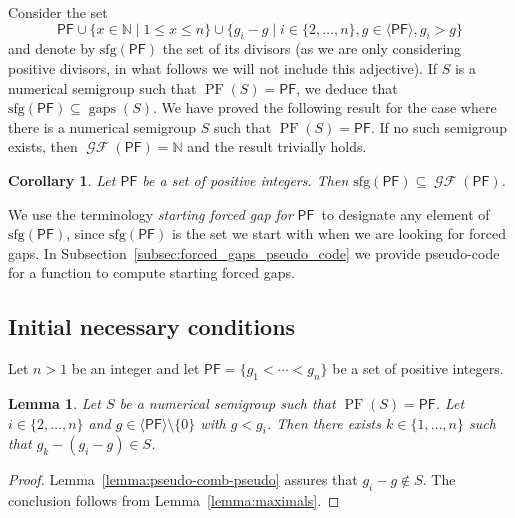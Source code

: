 \documentclass[11pt]{amsart}
\newtheorem{lemma}[theorem]{Lemma}
\newtheorem{corollary}[theorem]{Corollary}
\theoremstyle{remark}
\begin{document}
Consider the set
$${\ensuremath{\mathsf{PF}}}\cup\{x\in\mathbb{N}\mid 1\le x\le n\}\cup\{g_i-g\mid i\in \{2,\ldots,n\}, g\in\langle {\ensuremath{\mathsf{PF}}}\rangle, g_i>g\}$$
and denote by $\mathrm{sfg}({\ensuremath{\mathsf{PF}}})$ the set of its divisors (as we are only considering positive divisors, in what follows we will not include this adjective).
If $S$ is a numerical semigroup such that $\operatorname{PF}(S)={\ensuremath{\mathsf{PF}}}$, we deduce that $\mathrm{sfg}({\ensuremath{\mathsf{PF}}})\subseteq \operatorname{gaps}(S)$. 
We have proved the following result for the case where there is a numerical semigroup $S$ such that $\operatorname{PF}(S)={\ensuremath{\mathsf{PF}}}$. If no such semigroup exists, then $\operatorname{\mathcal{GF}}({\ensuremath{\mathsf{PF}}})=\mathbb N$ and the result trivially holds.
\begin{corollary}\label{cor:starting_forced_gaps}
Let ${\ensuremath{\mathsf{PF}}}$ be a set of positive integers. Then $\mathrm{sfg}({\ensuremath{\mathsf{PF}}})\subseteq \operatorname{\mathcal{GF}}({\ensuremath{\mathsf{PF}}})$.
\end{corollary}
We use the terminology \emph{starting forced gap for} {\ensuremath{\mathsf{PF}}}\ to designate any element of $\mathrm{sfg}({\ensuremath{\mathsf{PF}}})$, since $\mathrm{sfg}({\ensuremath{\mathsf{PF}}})$ is the set we start with when we are looking for forced gaps. In Subsection~\ref{subsec:forced_gaps_pseudo_code} we provide pseudo-code for a function to compute starting forced gaps.

\subsection{Initial necessary conditions}
\label{subsec:starting_conditions}
Let $n>1$ be an integer and let ${\ensuremath{\mathsf{PF}}} = \{g_1<\cdots <g_n\}$ be a set of positive integers.
\begin{lemma}\label{lemma:naive_condition}
Let $S$ be a numerical semigroup such that $\operatorname{PF}(S)={\ensuremath{\mathsf{PF}}}$.
Let  $i\in\{2,\ldots,n\}$ and $g\in\langle {\ensuremath{\mathsf{PF}}}\rangle\setminus\{0\}$ with $g<g_i$. Then there exists $k\in \{1,\ldots,n\}$ such that $g_k-(g_i-g)\in S$. 
\end{lemma}
\begin{proof}
Lemma~\ref{lemma:pseudo-comb-pseudo} assures that $g_i-g\not\in S$. The conclusion follows from Lemma~\ref{lemma:maximals}.
\end{proof}
\end{document}
